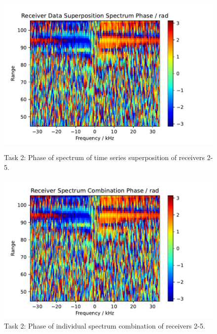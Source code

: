 \begin{figure}
    \centering
    \begin{minipage}{0.48\textwidth}
        \centering
        \includegraphics[width=\textwidth]{graphics/t2/t2-sup-phase.pdf}
    \caption{Task 2: Phase of spectrum of time series superposition of receivers 2-5.}
    \label{fig:t2-sup-phase}
    \end{minipage}\hfill
    \begin{minipage}{0.48\textwidth}
        \centering
        \includegraphics[width=\textwidth]{graphics/t2/t2-comb-phase.pdf}
    \caption{Task 2: Phase of individual spectrum combination of receivers 2-5.}
    \label{fig:t2-comb-phase}
    \end{minipage}
\end{figure}
